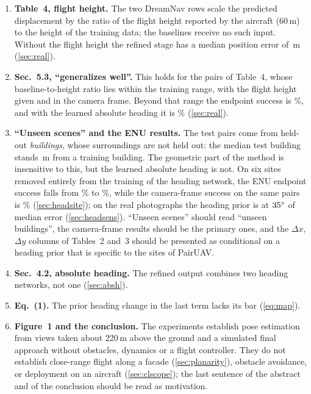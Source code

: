\begin{enumerate}[leftmargin=*,itemsep=2pt,topsep=3pt]
\item \textbf{Table~4, flight height.} The two DreamNav rows scale the predicted displacement by the ratio of the flight height reported by the aircraft (60\,m) to the height of the training data; the baselines receive no such input. Without the flight height the refined stage has a median position error of \rlNoHeightPos\,m (\cref{sec:real}).
\item \textbf{Sec.~5.3, ``generalizes well''.} This holds for the pairs of Table~4, whose baseline-to-height ratio lies within the training range, with the flight height given and in the camera frame. Beyond that range the endpoint success is \rlSiiOutSRe\%, and with the learned absolute heading it is \rlEnuSRe\% (\cref{sec:real}).
\item \textbf{``Unseen scenes'' and the ENU results.} The test pairs come from held-out \emph{buildings}, whose surroundings are not held out: the median test building stands \hdDistMedian\,m from a training building. The geometric part of the method is insensitive to this, but the learned absolute heading is not. On six sites removed entirely from the training of the heading network, the ENU endpoint success falls from \hdSdSeenSRe\% to \hdSdUnseenSRe\%, while the camera-frame success on the same pairs is \hdSdCamSRe\% (\cref{sec:headsite}); on the real photographs the heading prior is at $35^\circ$ of median error (\cref{sec:headsens}). ``Unseen scenes'' should read ``unseen buildings'', the camera-frame results should be the primary ones, and the $\Delta x$, $\Delta y$ columns of Tables~2 and~3 should be presented as conditional on a heading prior that is specific to the sites of PairUAV. 
\item \textbf{Sec.~4.2, absolute heading.} The refined output combines two heading networks, not one (\cref{sec:absh}).
\item \textbf{Eq.~(1).} The prior heading change in the last term lacks its bar (\cref{eq:map}).
\item \textbf{Figure~1 and the conclusion.} The experiments establish pose estimation from views taken about 220\,m above the ground and a simulated final approach without obstacles, dynamics or a flight controller. They do not establish close-range flight along a facade (\cref{sec:planarity}), obstacle avoidance, or deployment on an aircraft (\cref{sec:clscope}); the last sentence of the abstract and of the conclusion should be read as motivation.
\end{enumerate}

